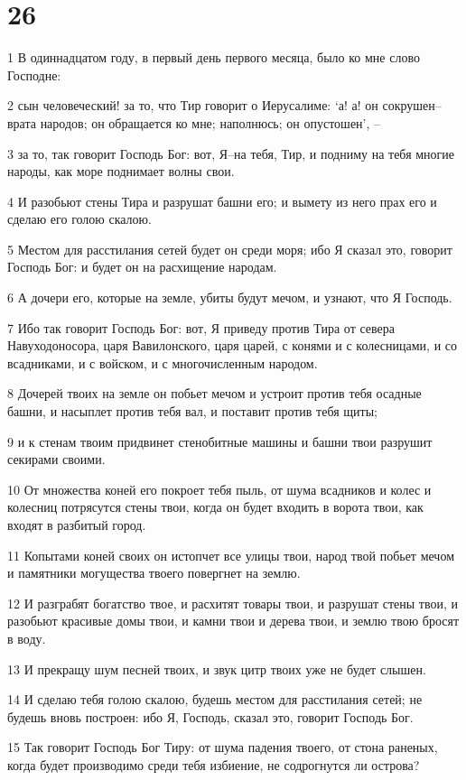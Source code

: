 \chapter{26}

\par 1 В одиннадцатом году, в первый день первого месяца, было ко мне слово Господне:
\par 2 сын человеческий! за то, что Тир говорит о Иерусалиме: `а! а! он сокрушен--врата народов; он обращается ко мне; наполнюсь; он опустошен', --
\par 3 за то, так говорит Господь Бог: вот, Я--на тебя, Тир, и подниму на тебя многие народы, как море поднимает волны свои.
\par 4 И разобьют стены Тира и разрушат башни его; и вымету из него прах его и сделаю его голою скалою.
\par 5 Местом для расстилания сетей будет он среди моря; ибо Я сказал это, говорит Господь Бог: и будет он на расхищение народам.
\par 6 А дочери его, которые на земле, убиты будут мечом, и узнают, что Я Господь.
\par 7 Ибо так говорит Господь Бог: вот, Я приведу против Тира от севера Навуходоносора, царя Вавилонского, царя царей, с конями и с колесницами, и со всадниками, и с войском, и с многочисленным народом.
\par 8 Дочерей твоих на земле он побьет мечом и устроит против тебя осадные башни, и насыплет против тебя вал, и поставит против тебя щиты;
\par 9 и к стенам твоим придвинет стенобитные машины и башни твои разрушит секирами своими.
\par 10 От множества коней его покроет тебя пыль, от шума всадников и колес и колесниц потрясутся стены твои, когда он будет входить в ворота твои, как входят в разбитый город.
\par 11 Копытами коней своих он истопчет все улицы твои, народ твой побьет мечом и памятники могущества твоего повергнет на землю.
\par 12 И разграбят богатство твое, и расхитят товары твои, и разрушат стены твои, и разобьют красивые домы твои, и камни твои и дерева твои, и землю твою бросят в воду.
\par 13 И прекращу шум песней твоих, и звук цитр твоих уже не будет слышен.
\par 14 И сделаю тебя голою скалою, будешь местом для расстилания сетей; не будешь вновь построен: ибо Я, Господь, сказал это, говорит Господь Бог.
\par 15 Так говорит Господь Бог Тиру: от шума падения твоего, от стона раненых, когда будет производимо среди тебя избиение, не содрогнутся ли острова?
